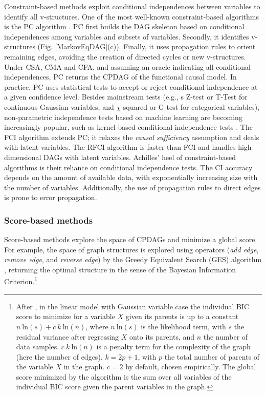 \documentclass[a4paper, 11pt]{article}
\begin{document}
Constraint-based methods exploit conditional independences between variables to identify all v-structures.  One of the most well-known constraint-based algorithms is the PC algorithm \citep{spirtes1993search}. PC first builds the DAG skeleton based on conditional independences among variables and subsets of variables. Secondly, it identifies v-structures (Fig. \ref{MarkovEqDAG}(c)). Finally, it uses propagation rules to orient remaining edges, avoiding the creation of directed cycles or new v-structures. Under CSA, CMA and CFA, and assuming an oracle indicating all conditional independences, PC returns the CPDAG of the functional causal model. In practice, PC uses statistical tests to accept or reject conditional independence at a given confidence level. Besides mainstream tests (e.g., s Z-test or T-Test for continuous Gaussian variables, and $\chi$-squared or G-test for categorical variables), non-parametric independence tests based on machine learning are becoming increasingly popular, such as kernel-based conditional independence tests \citep{zhang2012kernel}.
The FCI algorithm \citep{spirtes1999algorithm} extends PC; it relaxes the  \textit{causal sufficiency} assumption and deals with latent variables. The RFCI algorithm \citep{colombo2012learning} is faster than FCI and handles high-dimensional DAGs with latent variables.
Achilles' heel of constraint-based algorithms is their reliance on conditional independence tests. The CI accuracy depends on the amount of available data, with exponentially increasing size with the number of variables. Additionally, the use of propagation rules to direct edges is prone to error propagation.

\subsubsection{Score-based methods} 

Score-based methods explore the space of CPDAGs and minimize a global score. For example, the space of graph structures is explored using operators (\textit{add edge}, \textit{remove  edge}, and \textit{reverse edge}) by the Greedy Equivalent Search (GES) algorithm \citep{chickering2002optimal}, returning the optimal structure in the sense of  the Bayesian Information Criterion.\footnote{After \cite{ramsey2015scaling}, in the linear model with Gaussian variable case the individual BIC score to minimize for a variable $X$ given its parents is up to a constant $n~\text{ln}(s)+ c~k~\text{ln}(n)$, where $n~\text{ln}(s)$ is the likelihood term, with $s$ the residual variance after regressing $X$ onto its parents, and $n$ the number of data samples. $c~k~\text{ln}(n)$ is a penalty term for the complexity of the graph (here  the number of edges). $k = 2p + 1$, with $p$ the total number of parents of the variable $X$ in the graph. $c=2$ by default, chosen empirically. The global score minimized by the algorithm is the sum over all variables of the individual BIC score given the parent variables in the graph.}
\end{document}
